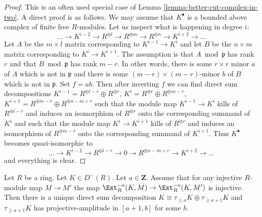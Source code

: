 \begin{proof}
This is an often used special case of
Lemma \ref{lemma-better-cut-complex-in-two}.
A direct proof is as follows.
We may assume that $K^\bullet$ is a bounded above
complex of finite free $R$-modules. Let us inspect what is happening
in degree $i$:
$$
\ldots \to K^{i - 2} \to R^{\oplus l}
\to R^{\oplus m} \to R^{\oplus n} \to K^{i + 2} \to \ldots
$$
Let $A$ be the $m \times l$ matrix corresponding to $K^{i - 1} \to K^i$
and let $B$ be the $n \times m$ matrix corresponding to $K^i \to K^{i + 1}$.
The assumption is that $A \bmod \mathfrak p$ has rank $r$ and that
$B \bmod \mathfrak p$ has rank $m - r$. In other words, there is some
$r \times r$ minor $a$ of $A$ which is not in $\mathfrak p$ and there is
some $(m - r) \times (m - r)$-minor $b$ of $B$ which is not in $\mathfrak p$.
Set $f = ab$. Then after inverting $f$ we can find direct sum decompositions
$K^{i - 1} = R^{\oplus l - r} \oplus R^{\oplus r}$,
$K^i = R^{\oplus r} \oplus R^{\oplus m - r}$,
$K^{i + 1} = R^{\oplus m - r} \oplus R^{\oplus n - m + r}$
such that the module map $K^{i - 1} \to K^i$ kills of
$R^{\oplus l - r}$ and induces an isomorphism of $R^{\oplus r}$ onto the
corresponding summand of $K^i$ and such that the module map $K^i \to K^{i + 1}$
kills of $R^{\oplus r}$ and induces an isomorphism of $R^{\oplus m - r}$
onto the corresponding summand of $K^{i + 1}$. Thus $K^\bullet$ becomes
quasi-isomorphic to
$$
\ldots \to K^{i - 2} \to R^{\oplus l - r}
\to 0 \to R^{\oplus n - m + r} \to K^{i + 2} \to \ldots
$$
and everything is clear.
\end{proof}

\begin{lemma}
\label{lemma-split-using-ext-injective}
Let $R$ be a ring. Let $K \in D^-(R)$. Let $a \in \mathbf{Z}$.
Assume that for any injective $R$-module map $M \to M'$ the map
$\Ext^{-a}_R(K, M) \to \Ext^{-a}_R(K, M')$ is injective.
Then there is a unique direct sum decomposition
$K \cong \tau_{\leq a}K \oplus \tau_{\geq a + 1}K$
and $\tau_{\geq a + 1}K$ has projective-amplitude in $[a + 1, b]$
for some $b$.
\end{lemma}

